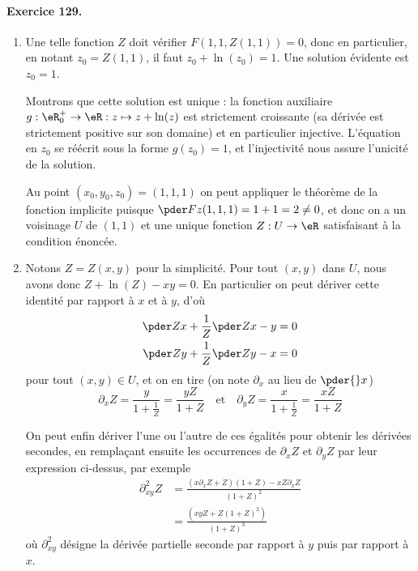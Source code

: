 \paragraph{Exercice 129.}
\begin{enumerate}
\item Une telle fonction $Z$ doit vérifier $F(1,1,Z(1,1)) = 0$, donc
en particulier, en notant $z_0 = Z(1,1)$, il faut $z_0 + \ln(z_0) =
1$. Une solution évidente est $z_0 = 1$.

Montrons que cette solution est unique : la fonction auxiliaire $g :
\eR_0^+ \to \eR : z \mapsto z + \ln(z)$ est strictement croissante
(sa dérivée est strictement positive sur son domaine) et en
particulier injective. L'équation en $z_0$ se réécrit sous la forme
$g(z_0) = 1$, et l'injectivité nous assure l'unicité de la solution.

Au point $(x_0,y_0,z_0) = (1,1,1)$ on peut appliquer le théorème de
la fonction implicite puisque $\pder F z(1,1,1) = 1 + 1 = 2 \neq 0$,
et donc on a un voisinage $U$ de $(1,1)$ et une unique fonction $Z :
U \to \eR$ satisfaisant à la condition énoncée.

\item Notons $Z = Z(x,y)$ pour la simplicité. Pour tout $(x,y)$ dans
$U$, nous avons donc $Z + \ln(Z) - xy = 0$. En particulier on peut
dériver cette identité par rapport à $x$ et à $y$, d'où
\begin{equation*}
\begin{split}
\pder Z x + \frac 1Z \pder Z x - y = 0\\
\pder Z y + \frac 1Z \pder Z y - x = 0
\end{split}
\end{equation*}
pour tout $(x,y) \in U$, et on en tire (on note $\partial_x$ au lieu
de $\pder {} x$)
\begin{equation*}
\partial_x Z = \frac y {1+\frac1Z} = \frac{y Z}{1+Z}
\quad\text{et}\quad   \partial_y Z = \frac x {1+\frac1Z} = \frac {x Z} {1+Z}
\end{equation*}

On peut enfin dériver l'une ou l'autre de ces égalités pour obtenir
les dérivées secondes, en remplaçant ensuite les occurrences de
$\partial_x Z$ et $\partial_y Z$ par leur expression ci-dessus, par
exemple
\begin{equation*}
\begin{split}
\partial^2_{xy} Z &= \frac{(x \partial_x Z + Z)(1+Z) - x
Z \partial_x Z}{(1+Z)^2}\\
&= \frac{(x y Z + Z (1+Z)^2)}{(1+Z)^3}
\end{split}
\end{equation*}
où $\partial^2_{xy}$ désigne la dérivée partielle seconde par
rapport à $y$ puis par rapport à $x$.
\end{enumerate}
